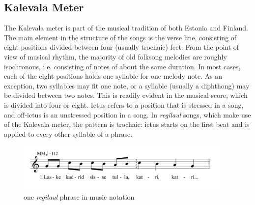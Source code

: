 \documentclass[11pt]{article}
\begin{document}

\subsection*{Kalevala Meter}
  The Kalevala meter is part of the musical tradition of both Estonia and Finland. The main element in the structure of the songs is the verse line, consisting of eight positions divided between four (usually trochaic) feet. From the point of view of musical rhythm, the majority of old folksong melodies are roughly isochronous, i.e. consisting of notes of about the same
 duration. In most cases, each of the eight positions holds one syllable for one melody note. As an exception, two syllables may fit one note, or a syllable (usually a diphthong) may be divided between two notes. This is readily evident in the musical score, which is divided into four or eight. Ictus refers to a position that is stressed in a song, and off-ictus is an unstressed position in a song. In {\it regilaul} songs, which make use of the Kalevala meter, the pattern is trochaic: ictus starts on the first beat and is applied to every other syllable of a phrase. \\
 
 
 \begin{figure}[htbp]
\begin{center}
\includegraphics[width=300pt]{melody.png}
\caption{one {\it regilaul} phrase in music notation}
\label{default}
\end{center}
\end{figure}
\end{document}
